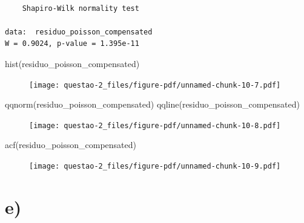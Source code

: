 \documentclass[
  letterpaper,
  DIV=11,
  numbers=noendperiod]{scrreprt}
\newenvironment{Shaded}{\begin{snugshade}}{\end{snugshade}}
\newcommand{\FunctionTok}[1]{\textcolor[rgb]{0.28,0.35,0.67}{#1}}
\newcommand{\NormalTok}[1]{\textcolor[rgb]{0.00,0.23,0.31}{#1}}
\begin{document}
\begin{verbatim}

    Shapiro-Wilk normality test

data:  residuo_poisson_compensated
W = 0.9024, p-value = 1.395e-11
\end{verbatim}

\begin{Shaded}
\begin{Highlighting}[]
\FunctionTok{hist}\NormalTok{(residuo\_poisson\_compensated)}
\end{Highlighting}
\end{Shaded}

\begin{figure}[H]

{\centering \texttt{[image: questao-2\_files/figure-pdf/unnamed-chunk-10-7.pdf]}

}

\end{figure}

\begin{Shaded}
\begin{Highlighting}[]
\FunctionTok{qqnorm}\NormalTok{(residuo\_poisson\_compensated)}
\FunctionTok{qqline}\NormalTok{(residuo\_poisson\_compensated)}
\end{Highlighting}
\end{Shaded}

\begin{figure}[H]

{\centering \texttt{[image: questao-2\_files/figure-pdf/unnamed-chunk-10-8.pdf]}

}

\end{figure}

\begin{Shaded}
\begin{Highlighting}[]
\FunctionTok{acf}\NormalTok{(residuo\_poisson\_compensated)}
\end{Highlighting}
\end{Shaded}

\begin{figure}[H]

{\centering \texttt{[image: questao-2\_files/figure-pdf/unnamed-chunk-10-9.pdf]}

}

\end{figure}

\hypertarget{e}{%
\section*{e)}\label{e}}
\end{document}
